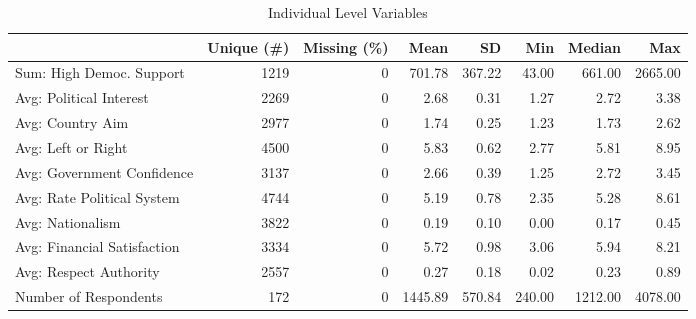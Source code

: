 \begin{table}

\caption{Individual Level Variables}
\centering
\begin{tabular}[t]{lrrrrrrr}
\toprule
  & Unique (\#) & Missing (\%) & Mean & SD & Min & Median & Max\\
\midrule
Sum: High Democ. Support & 1219 & 0 & 701.78 & 367.22 & 43.00 & 661.00 & 2665.00\\
Avg: Political Interest & 2269 & 0 & 2.68 & 0.31 & 1.27 & 2.72 & 3.38\\
Avg: Country Aim & 2977 & 0 & 1.74 & 0.25 & 1.23 & 1.73 & 2.62\\
Avg: Left or Right & 4500 & 0 & 5.83 & 0.62 & 2.77 & 5.81 & 8.95\\
Avg: Government Confidence & 3137 & 0 & 2.66 & 0.39 & 1.25 & 2.72 & 3.45\\
Avg: Rate Political System & 4744 & 0 & 5.19 & 0.78 & 2.35 & 5.28 & 8.61\\
Avg: Nationalism & 3822 & 0 & 0.19 & 0.10 & 0.00 & 0.17 & 0.45\\
Avg: Financial Satisfaction & 3334 & 0 & 5.72 & 0.98 & 3.06 & 5.94 & 8.21\\
Avg: Respect Authority & 2557 & 0 & 0.27 & 0.18 & 0.02 & 0.23 & 0.89\\
Number of Respondents & 172 & 0 & 1445.89 & 570.84 & 240.00 & 1212.00 & 4078.00\\
\bottomrule
\end{tabular}
\end{table}
